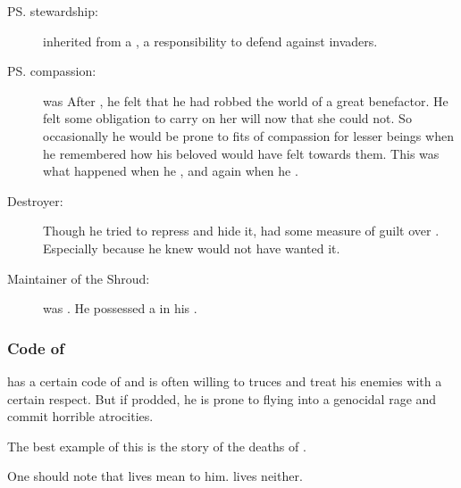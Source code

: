 \begin{description}
  \item[\ps{\Nexagglachel} stewardship:]
    \Ishnaruchaefir inherited from \Nexagglachel a , a responsibility to defend \Miith against invaders. 
  
  \item[\ps{\Rystessakhin} compassion:]
    \Rystessakhin was 
    After , he felt that he had robbed the world of a great benefactor. 
    He felt some obligation to carry on her will now that she could not.
    So occasionally he would be prone to fits of compassion for lesser beings when he remembered how his beloved would have felt towards them.
    This was what happened when he , and again when he .
  
  \item[Destroyer:]
    Though he tried to repress and hide it, \Ishnaruchaefir had some measure of guilt over . 
    Especially because he knew \Rystessakhin would not have wanted it.
  
  \item[Maintainer of the Shroud:]
    \Ishnaruchaefir was . 
    He possessed a  in his . 

\end{description}






\subsubsection{Code of \honour}
\Ishnaruchaefir{} has a certain code of \honour and is often willing to \honour truces and treat his enemies with a certain respect. 
But if prodded, he is prone to flying into a genocidal rage and commit horrible atrocities. 

The best example of this is the story of the deaths of . 

One should note that \resphan{} lives mean  to him. 
\Human{} lives neither. 





